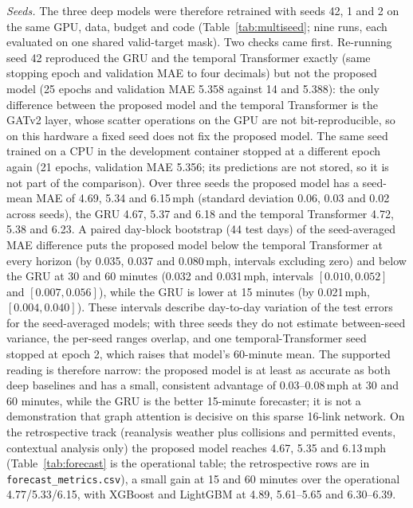 \textit{Seeds.} The three deep models were therefore retrained with seeds 42, 1 and 2 on the same GPU, data, budget and
code (Table~\ref{tab:multiseed}; nine runs, each evaluated on one shared valid-target mask). Two checks came first.
Re-running seed 42 reproduced the GRU and the temporal Transformer exactly (same stopping epoch and validation MAE to
four decimals) but not the proposed model (25 epochs and validation MAE 5.358 against 14 and 5.388): the only
difference between the proposed model and the temporal Transformer is the GATv2 layer, whose scatter operations on the
GPU are not bit-reproducible, so on this hardware a fixed seed does not fix the proposed model. The same seed trained
on a CPU in the development container stopped at a different epoch again (21 epochs, validation MAE 5.356; its
predictions are not stored, so it is not part of the comparison). Over three seeds the proposed model
has a seed-mean MAE of 4.69, 5.34 and 6.15\,mph (standard deviation 0.06, 0.03 and 0.02 across seeds), the GRU 4.67,
5.37 and 6.18 and the temporal Transformer 4.72, 5.38 and 6.23. A paired day-block bootstrap (44 test days) of the
seed-averaged MAE difference puts the proposed model below the temporal Transformer at every horizon (by 0.035, 0.037
and 0.080\,mph, intervals excluding zero) and below the GRU at 30 and 60 minutes (0.032 and 0.031\,mph, intervals
$[0.010, 0.052]$ and $[0.007, 0.056]$), while the GRU is lower at 15 minutes (by 0.021\,mph, $[0.004, 0.040]$). These
intervals describe day-to-day variation of the test errors for the seed-averaged models; with three seeds they do not
estimate between-seed variance, the per-seed ranges overlap, and one temporal-Transformer seed stopped at epoch 2,
which raises that model's 60-minute mean. The supported reading is therefore narrow: the proposed model is at least as
accurate as both deep baselines and has a small, consistent advantage of 0.03--0.08\,mph at 30 and 60 minutes, while the
GRU is the better 15-minute forecaster; it is not a demonstration that graph attention is decisive on this sparse
16-link network. On the retrospective
track (reanalysis weather plus collisions and permitted events, contextual analysis only) the proposed model reaches
4.67, 5.35 and 6.13\,mph (Table~\ref{tab:forecast} is the operational table; the retrospective rows are in
\texttt{forecast\_metrics.csv}), a small gain at 15 and 60 minutes over the operational 4.77/5.33/6.15, with XGBoost
and LightGBM at 4.89, 5.61--5.65 and 6.30--6.39.

